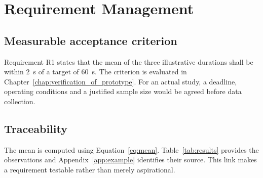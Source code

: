 \chapter{Requirement Management}
\label{chap:requirement_management}

\section{Measurable acceptance criterion}
\label{sec:requirements}
Requirement R1 states that the mean of the three illustrative durations shall
be within \qty{2}{\second} of a target of \qty{60}{\second}.
The criterion is evaluated in Chapter~\ref{chap:verification_of_prototype}.
For an actual study, a deadline, operating conditions and a justified sample size
would be agreed before data collection.

\section{Traceability}
The mean is computed using Equation~\ref{eq:mean}. Table~\ref{tab:results}
provides the observations and Appendix~\ref{app:example} identifies their source.
This link makes a requirement testable rather than merely aspirational.
